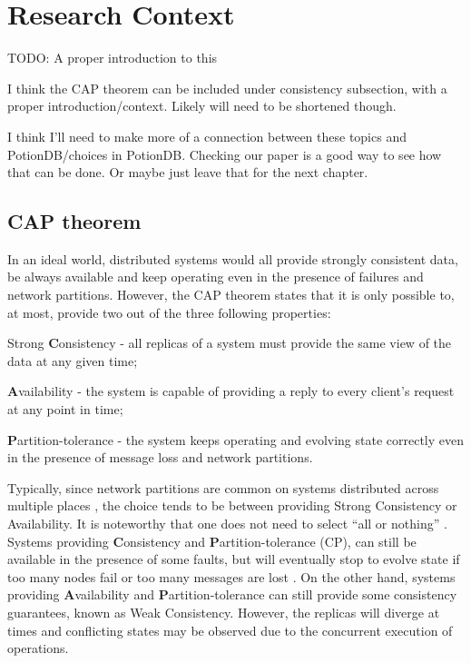 
%

\chapter{Research Context}

TODO: A proper introduction to this

I think the CAP theorem can be included under consistency subsection, with a proper introduction/context. Likely will need to be shortened though.

I think I'll need to make more of a connection between these topics and PotionDB/choices in PotionDB. Checking our paper is a good way to see how that can be done.
Or maybe just leave that for the next chapter.

\section{CAP theorem}
\label{sec:cap}

In an ideal world, distributed systems would all provide strongly consistent data, be always available and keep operating even in the presence of failures and network partitions.
However, the CAP theorem \cite{cap} states that it is only possible to, at most, provide two out of the three following properties:
\begin{enumerate*}[label=(\roman*)]
	\item Strong \textbf{C}onsistency - all replicas of a system must provide the same view of the data at any given time;
	\item \textbf{A}vailability - the system is capable of providing a reply to every client's request at any point in time;
	\item \textbf{P}artition-tolerance - the system keeps operating and evolving state correctly even in the presence of message loss and network partitions.
\end{enumerate*}

Typically, since network partitions are common on systems distributed across multiple places \cite{understandingEC}, the choice tends to be between providing Strong Consistency or Availability.
It is noteworthy that one does not need to select ``all or nothing'' \cite{understandingEC}. 
Systems providing \textbf{C}onsistency and \textbf{P}artition-tolerance (CP), can still be available in the presence of some faults, but will eventually stop to evolve state if too many nodes fail or too many messages are lost \cite{cap}.
On the other hand, systems providing \textbf{A}vailability and \textbf{P}artition-tolerance can still provide some consistency guarantees, known as Weak Consistency. However, the replicas will diverge at times and conflicting states may be observed due to the concurrent execution of operations.

